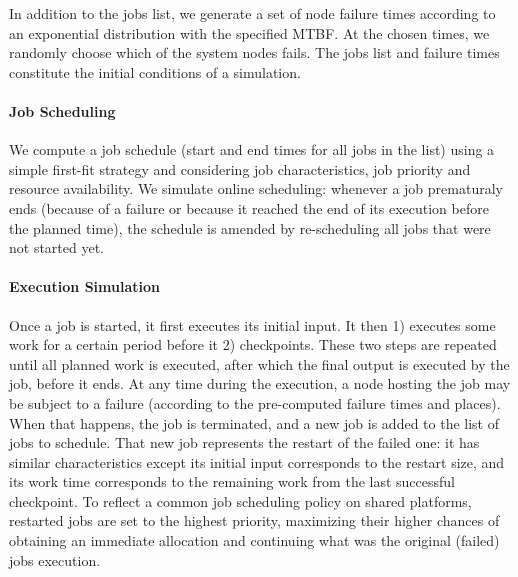 In addition to the jobs list, we generate a set of node failure times according to an
exponential distribution with the specified MTBF. At the chosen times, we randomly
choose which of the system nodes fails.  The jobs list and failure times constitute
the initial conditions of a simulation.

\paragraph*{Job Scheduling}
We compute a job schedule (start and end times for all jobs in the list) using a
simple first-fit strategy and considering job characteristics, job priority and
resource availability.  We simulate online scheduling: whenever a job prematuraly
ends (because of a failure or because it reached the end of its execution before the
planned time), the schedule is amended by re-scheduling all jobs that were not
started yet. 

\paragraph*{Execution Simulation}
Once a job is started, it first executes its initial input. It then 1) executes some
work for a certain period before it 2) checkpoints. These two steps are repeated
until all planned work is executed, after which the final output is executed by the
job, before it ends. At any time during the execution, a node hosting the job may be
subject to a failure (according to the pre-computed failure times and places). When
that happens, the job is terminated, and a new job is added to the list of jobs to
schedule. That new job represents the restart of the failed one: it has similar
characteristics except its initial input corresponds to the restart size, and its
work time corresponds to the remaining work from the last successful checkpoint. To
reflect a common job scheduling policy on shared platforms, restarted jobs are set to
the highest priority, maximizing their higher chances of obtaining an immediate
allocation and continuing what was the original (failed) jobs execution.


\ifTR

